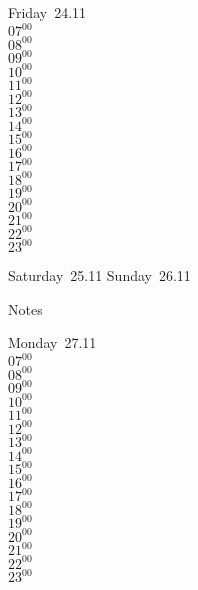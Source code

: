 \documentclass[11pt, a4paper]{book}\usepackage[]{graphicx}\usepackage[]{color}
\begin{document}
\begin{weekdaybox}
  Friday~24.11\\
  { 
  \vfill
  $07^{00}$\\
$08^{00}$\\
$09^{00}$\\
$10^{00}$\\
$11^{00}$\\
$12^{00}$\\
$13^{00}$\\
$14^{00}$\\
$15^{00}$\\
$16^{00}$\\
$17^{00}$\\
$18^{00}$\\
$19^{00}$\\
$20^{00}$\\
$21^{00}$\\
$22^{00}$\\
$23^{00}$\\
  }
\end{weekdaybox}
\begin{weekendbox}
  Saturday~25.11
  \tcblower
  Sunday~26.11
\end{weekendbox} %
\begin{notebox}
  Notes
\end{notebox}
\clearpage
\begin{headerbox}
\end{headerbox}
\begin{weekdaybox}
  Monday~27.11\\
  { 
  \vfill
  $07^{00}$\\
$08^{00}$\\
$09^{00}$\\
$10^{00}$\\
$11^{00}$\\
$12^{00}$\\
$13^{00}$\\
$14^{00}$\\
$15^{00}$\\
$16^{00}$\\
$17^{00}$\\
$18^{00}$\\
$19^{00}$\\
$20^{00}$\\
$21^{00}$\\
$22^{00}$\\
$23^{00}$\\
  }
\end{weekdaybox}
\end{document}
